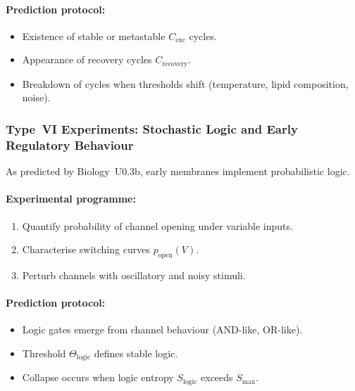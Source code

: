 \paragraph{Prediction protocol:}

\begin{itemize}
    \item Existence of stable or metastable $C_{\mathrm{exc}}$ cycles.
    \item Appearance of recovery cycles $C_{\mathrm{recovery}}$.
    \item Breakdown of cycles when thresholds shift 
          (temperature, lipid composition, noise).
\end{itemize}



\subsubsection{Type~VI Experiments: Stochastic Logic and Early Regulatory Behaviour}

As predicted by Biology~U0.3b, early membranes implement probabilistic logic.

\paragraph{Experimental programme:}

\begin{enumerate}
    \item Quantify probability of channel opening under variable inputs.
    \item Characterise switching curves $p_{\mathrm{open}}(V)$.
    \item Perturb channels with oscillatory and noisy stimuli.
\end{enumerate}

\paragraph{Prediction protocol:}

\begin{itemize}
    \item Logic gates emerge from channel behaviour (AND-like, OR-like).
    \item Threshold $\Theta_{\mathrm{logic}}$ defines stable logic.
    \item Collapse occurs when logic entropy $S_{\mathrm{logic}}$ 
          exceeds $S_{\max}$.
\end{itemize}



